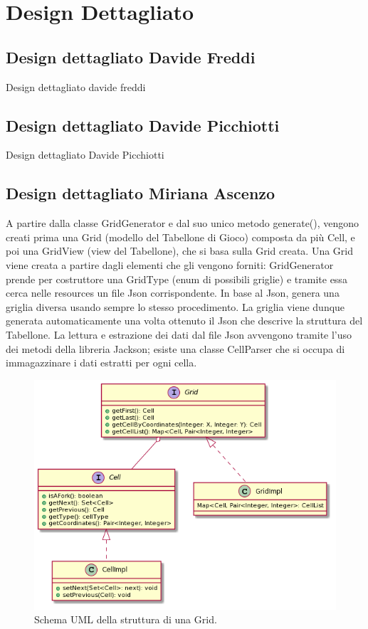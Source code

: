 \documentclass[a4paper,12pt]{report}
\begin{document}
\section{Design Dettagliato}

\subsection{Design dettagliato Davide Freddi}
Design dettagliato davide freddi

\subsection{Design dettagliato Davide Picchiotti}
Design dettagliato Davide Picchiotti

\subsection{Design dettagliato Miriana Ascenzo}

A partire dalla classe GridGenerator e dal suo unico metodo generate(), vengono creati prima una Grid (modello del Tabellone di Gioco) composta da più Cell, e poi una GridView (view del Tabellone), che si basa sulla Grid creata.
%
Una Grid viene creata a partire dagli elementi che gli vengono forniti: GridGenerator prende per costruttore una GridType (enum di possibili griglie) e tramite essa cerca nelle resources un file Json corrispondente.
%
In base al Json, genera una griglia diversa usando sempre lo stesso procedimento.
%
La griglia viene dunque generata automaticamente una volta ottenuto il Json che descrive la struttura del Tabellone.
%
La lettura e estrazione dei dati dal file Json avvengono tramite l’uso dei metodi della libreria Jackson; esiste una classe CellParser che si occupa di immagazzinare i dati estratti per ogni cella.

\begin{figure}[!t]
	\centering{}
	\includegraphics[width=\textwidth]{images/miriana/grid_implementation.png}
	\caption{Schema UML della struttura di una Grid.}
	\label{img:gridimplementation}
\end{figure}
\end{document}
